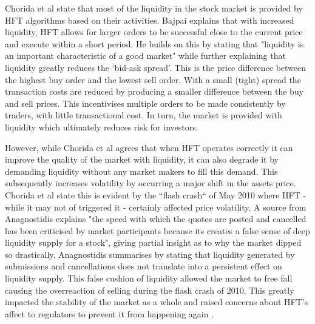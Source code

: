 Chorida et al \cite{REPORT:ChordiaEtAl:2013} state that most of the liquidity in the stock market is provided by HFT algorithms based on their activities. Bajpai \cite{WEB:Bajpai:0001} explains that with increased liquidity, HFT allows for larger orders to be successful close to the current price and execute within a short period. He builds on this by stating that "liquidity is an important characteristic of a good market" while further explaining that liquidity greatly reduces the `bid-ask spread'. This is the price difference between the highest buy order and the lowest sell order. With a small (tight) spread the transaction costs are reduced by producing a smaller difference between the buy and sell prices. This incentivises multiple orders to be made consistently by traders, with little transactional cost. In turn, the market is provided with liquidity which ultimately reduces risk for investors. 

However, while Chorida et al \cite{REPORT:ChordiaEtAl:2013} agrees that when HFT operates correctly it can improve the quality of the market with liquidity, it can also degrade it by demanding liquidity without any market makers to fill this demand. This subsequently increases volatility by occurring a major shift in the assets price. Chorida et al state this is evident by the ``flash crash`` of May 2010 where HFT - while it may not of triggered it - certainly affected price volatility. A source from Anagnostidis \cite{UNPUB:Anagnostidis:2017} explains "the speed with which the quotes are posted and cancelled has been criticised by market participants because its creates a false sense of deep liquidity supply for a stock", giving partial insight as to why the market dipped so drastically. Anagnostidis summarises by stating that liquidity generated by submissions and cancellations does not translate into a persistent effect on liquidity supply. This false cushion of liquidity allowed the market to free fall causing the overreaction of selling during the flash crash of 2010. This greatly impacted the stability of the market as a whole and raised concerns about HFT's affect to regulators to prevent it from happening again \cite{WEB:Kaufman:2016}.   

